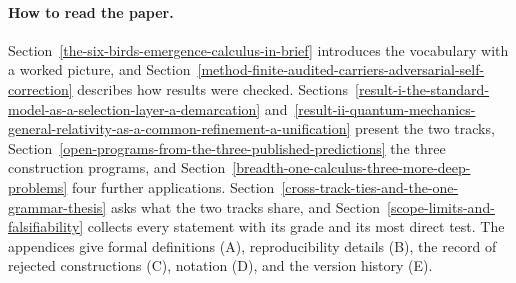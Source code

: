 \paragraph{How to read the paper.} Section~\ref{the-six-birds-emergence-calculus-in-brief} introduces the vocabulary
with a worked picture, and Section~\ref{method-finite-audited-carriers-adversarial-self-correction} describes how
results were checked. Sections~\ref{result-i-the-standard-model-as-a-selection-layer-a-demarcation}
and~\ref{result-ii-quantum-mechanics-general-relativity-as-a-common-refinement-a-unification} present the two tracks,
Section~\ref{open-programs-from-the-three-published-predictions} the three construction programs, and
Section~\ref{breadth-one-calculus-three-more-deep-problems} four further applications.
Section~\ref{cross-track-ties-and-the-one-grammar-thesis} asks what the two tracks share, and
Section~\ref{scope-limits-and-falsifiability} collects every statement with its grade and its most direct test. The
appendices give formal definitions (A), reproducibility details (B), the record of rejected constructions (C),
notation (D), and the version history (E).
